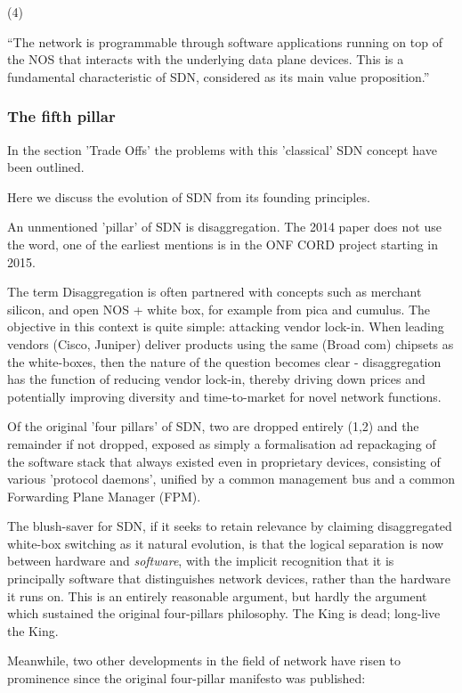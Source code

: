 (4)

“The network is programmable through software applications running on top of the
NOS that interacts with the underlying data plane devices. This is a fundamental
characteristic of SDN, considered as its main value proposition.”

\subsubsection{The fifth pillar}

In the section 'Trade Offs' the problems with this 'classical' SDN concept have been outlined.

Here we discuss the evolution of SDN from its founding principles.

An unmentioned 'pillar' of SDN is disaggregation.  The 2014 paper does not use the word, one of the earliest mentions is in the ONF CORD project starting in 2015.

The term Disaggregation is often partnered with concepts such as  merchant silicon, and open NOS + white box, for example from pica and cumulus.  The objective in this context is quite simple: attacking vendor lock-in.  When leading vendors (Cisco, Juniper) deliver products using the same (Broad com) chipsets as the white-boxes, then the nature of the question becomes clear - disaggregation has the function of reducing vendor lock-in, thereby driving down prices and potentially improving diversity and time-to-market for novel network functions.

Of the original 'four pillars' of SDN, two are dropped entirely (1,2) and the remainder if not dropped, exposed as simply a formalisation ad repackaging of the software stack that always existed even in proprietary devices, consisting of various 'protocol daemons', unified by a common management bus and a common Forwarding Plane Manager (FPM).

The blush-saver for SDN, if it seeks to retain relevance by claiming disaggregated white-box switching as it natural evolution, is that the logical separation is now between hardware and \textit{software}, with the implicit recognition that it is principally software that distinguishes network devices, rather than the hardware it runs on.  This is an entirely reasonable argument, but hardly the argument which sustained the original four-pillars philosophy.  The King is dead; long-live the King.

Meanwhile, two other developments in the field of network have risen to prominence since the original four-pillar manifesto was published:

